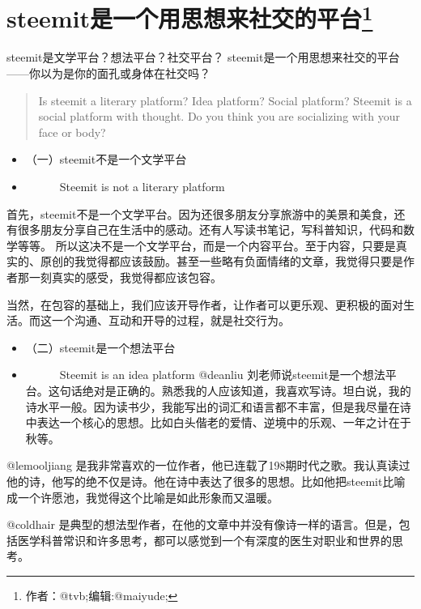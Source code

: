 \documentclass[]{ctexbook}
\providecommand{\tightlist}{%
  \setlength{\itemsep}{0pt}\setlength{\parskip}{0pt}}
\begin{document}
\hypertarget{steemit}{%
\section[steemit是一个用思想来社交的平台]{\texorpdfstring{steemit是一个用思想来社交的平台\footnote{作者：@tvb;编辑:@maiyude;}}{steemit是一个用思想来社交的平台}}\label{steemit}}

steemit是文学平台？想法平台？社交平台？
steemit是一个用思想来社交的平台------你以为是你的面孔或身体在社交吗？

\begin{quote}
Is steemit a literary platform? Idea platform? Social platform?
Steemit is a social platform with thought.
Do you think you are socializing with your face or body?
\end{quote}

\begin{itemize}
\tightlist
\item
  （一）steemit不是一个文学平台
\item
  　　　Steemit is not a literary platform
\end{itemize}

首先，steemit不是一个文学平台。因为还很多朋友分享旅游中的美景和美食，还有很多朋友分享自己在生活中的感动。还有人写读书笔记，写科普知识，代码和数学等等。
所以这决不是一个文学平台，而是一个内容平台。至于内容，只要是真实的、原创的我觉得都应该鼓励。甚至一些略有负面情绪的文章，我觉得只要是作者那一刻真实的感受，我觉得都应该包容。

当然，在包容的基础上，我们应该开导作者，让作者可以更乐观、更积极的面对生活。而这一个沟通、互动和开导的过程，就是社交行为。

\begin{itemize}
\tightlist
\item
  （二）steemit是一个想法平台
\item
  　　　Steemit is an idea platform
  @deanliu 刘老师说steemit是一个想法平台。这句话绝对是正确的。熟悉我的人应该知道，我喜欢写诗。坦白说，我的诗水平一般。因为读书少，我能写出的词汇和语言都不丰富，但是我尽量在诗中表达一个核心的思想。比如白头偕老的爱情、逆境中的乐观、一年之计在于秋等。
\end{itemize}

@lemooljiang 是我非常喜欢的一位作者，他已连载了198期时代之歌。我认真读过他的诗，他写的绝不仅是诗。他在诗中表达了很多的思想。比如他把steemit比喻成一个许愿池，我觉得这个比喻是如此形象而又温暖。

@coldhair 是典型的想法型作者，在他的文章中并没有像诗一样的语言。但是，包括医学科普常识和许多思考，都可以感觉到一个有深度的医生对职业和世界的思考。
\end{document}
